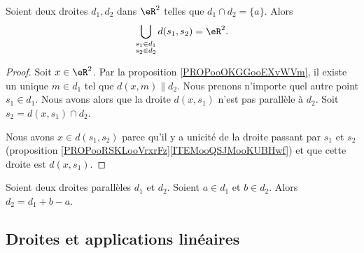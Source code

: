 \begin{proposition}	\label{PROPooQFWYooOxSMQI}
	Soient deux droites \( d_1,d_2\) dans \( \eR^2\) telles que \( d_1\cap d_2=\{ a \}\). Alors
	\begin{equation}
		\bigcup_{\substack{ s_1\in d_1 \\ s_2\in d_2 }  }d(s_1,s_2)=\eR^2.
	\end{equation}
\end{proposition}

\begin{proof}
	Soit \( x\in \eR^2\). Par la proposition \ref{PROPooOKGGooEXvWVm}, il existe un unique \( m\in d_1\) tel que \( d(x,m)\parallel d_2\). Nous prenons n'importe quel autre point \( s_1\in d_1\). Nous avons alors que la droite \( d(x,s_1)\) n'est pas parallèle à \( d_2\). Soit \( s_2=d(x,s_1)\cap d_2\).

	Nous avons \( x\in d(s_1,s_2)\) parce qu'il y a unicité de la droite passant par \( s_1\) et \( s_2\) (proposition \ref{PROPooRSKLooVrxrFz}\ref{ITEMooQSJMooKUBHwf}) et que cette droite est \( d(x,s_1)\).
\end{proof}

\begin{proposition}	\label{PROPooUTTPooDiRHNH}
	Soient deux droites parallèles \( d_1\) et \( d_2\). Soient \( a\in d_1\) et \( b\in d_2\). Alors \( d_2=d_1+b-a\).
\end{proposition}


\subsection{Droites et applications linéaires}


